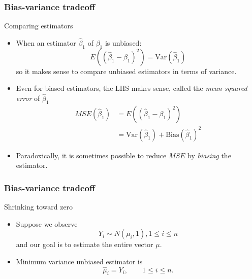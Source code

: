 \documentclass[handout]{beamer}
\begin{document}
   \begin{frame} \frametitle{Bias-variance tradeoff}

   \begin{block}
   {Comparing estimators}
   \begin{itemize}

   \item When an estimator $\widehat{\beta}_1$ of $\beta_1$ is unbiased:
   $$
   E((\widehat{\beta}_1 - \beta_1)^2) = \text{Var}(\widehat{\beta}_1)$$
   so it makes sense to compare unbiased estimators in terms of variance.

   \item Even for biased estimators, the LHS makes sense, called the
   {\em mean squared error} of $\widehat{\beta}_1$
   $$
   \begin{aligned}
   MSE(\widehat{\beta}_1) &= E((\widehat{\beta}_1 - \beta_1)^2) \\
   &= \text{Var}(\widehat{\beta}_1) + \text{Bias}(\widehat{\beta}_1)^2
   \end{aligned}
   $$
   \item Paradoxically, it is sometimes possible to reduce
   $MSE$ by {\em biasing} the estimator.

   \end{itemize}
   \end{block}
   \end{frame}


   \begin{frame} \frametitle{Bias-variance tradeoff}

   \begin{block}
   {Shrinking toward zero}
   \begin{itemize}
   \item Suppose we observe $$Y_i \sim N(\mu_i, 1), 1 \leq i \leq n$$ and our goal is to estimate the entire vector $\mu$.

   \item Minimum variance unbiased estimator is
   $$
   \widehat{\mu}_i = Y_i, \qquad 1 \leq i \leq n.$$


   \end{itemize}
   \end{block}
   \end{frame}

\end{document}
